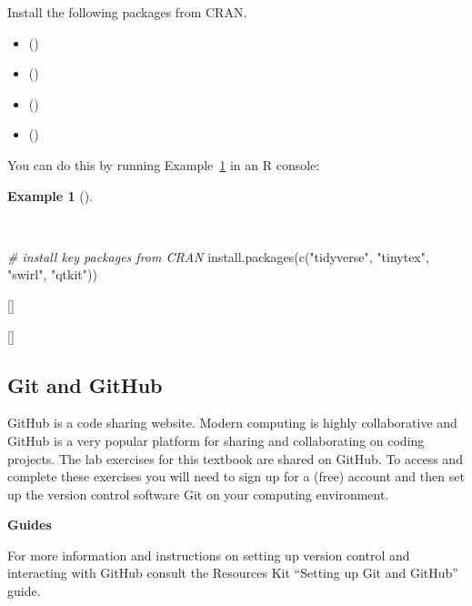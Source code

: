 \documentclass[
  letterpaper,
  krantz1]{latex/krantz-mod}
\newenvironment{Shaded}{\begin{snugshade}}{\end{snugshade}}
\newcommand{\CommentTok}[1]{\textcolor[rgb]{0.00,0.00,0.00}{\textit{#1}}}
\newcommand{\FunctionTok}[1]{\textcolor[rgb]{0.00,0.00,0.00}{#1}}
\newcommand{\NormalTok}[1]{\textcolor[rgb]{0.00,0.00,0.00}{#1}}
\newcommand{\StringTok}[1]{\textcolor[rgb]{0.00,0.00,0.00}{#1}}
\providecommand{\tightlist}{%
  \setlength{\itemsep}{0pt}\setlength{\parskip}{0pt}}\usepackage{longtable,booktabs,array}
\newcommand{\cindex}[1]{%
  \StrSubstitute{#1}{_}{\_}[\temp]%
  \index{\temp}%
}
\theoremstyle{definition}
\theoremstyle{definition}
\newtheorem{example}{Example}[chapter]
\theoremstyle{remark}
\begin{document}
Install the following packages from CRAN.

\begin{itemize}
\tightlist
\item
  ()
\item
   ()
\item
   ()
\item
   ()
\end{itemize}

You can do this by running Example~\ref{exm-install-packages} in an R
console:

\begin{example}[]\protect\hypertarget{exm-install-packages}{}\label{exm-install-packages}

~

\begin{Shaded}
\begin{Highlighting}[numbers=left,,]
\CommentTok{\# install key packages from CRAN}
\FunctionTok{install.packages}\NormalTok{(}\FunctionTok{c}\NormalTok{(}\StringTok{"tidyverse"}\NormalTok{, }\StringTok{"tinytex"}\NormalTok{, }\StringTok{"swirl"}\NormalTok{, }\StringTok{"qtkit"}\NormalTok{))}
\end{Highlighting}
\end{Shaded}

\end{example}

\cindex{install.packages()}
\cindex{c()}

\subsection*{Git and GitHub}\label{sec-preface-git-github}

GitHub is a code sharing website. Modern computing is
highly collaborative and GitHub is a very popular platform for sharing
and collaborating on coding projects. The lab exercises for this
textbook are shared on GitHub. To access and complete these exercises
you will need to sign up for a (free) account and then set up the
version control software Git on your computing environment.

\begin{tcolorbox}[enhanced jigsaw, toprule=.15mm, breakable, colback=white, arc=.35mm, left=2mm, colframe=quarto-callout-color-frame, opacityback=0, bottomrule=.15mm, rightrule=.15mm, leftrule=.75mm]

\textbf{ Guides}

For more information and instructions on setting up version control and
interacting with GitHub consult the Resources Kit ``Setting up Git and
GitHub'' guide.

\end{tcolorbox}
\end{document}
